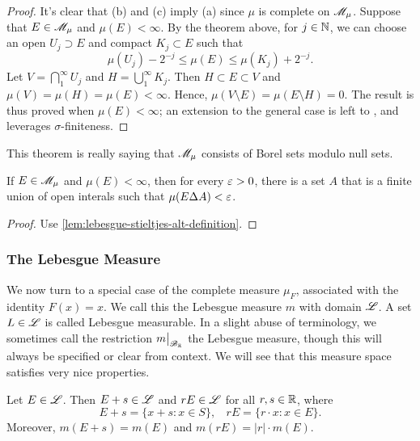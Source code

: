 \documentclass[12pt]{article} %
\begin{document}
\begin{proof}
    It's clear that (b) and (c) imply (a) since $\mu$ is complete on $\mathscr{M}_\mu$. Suppose that $E \in \mathscr{M}_\mu$ and $\mu(E) < \infty$. By the theorem above, for $j \in \mathbb{N}$, we can choose an open $U_j \supset E$ and compact $K_j \subset E$ such that \[\mu(U_j) - 2^{-j} \leq \mu(E) \leq \mu(K_j) + 2^{-j}.\]
    Let $V = \bigcap_1^\infty U_j$ and $H = \bigcup_1^\infty K_j$. Then $H \subset E \subset V$ and $\mu(V) = \mu(H) = \mu(E) < \infty$. Hence, $\mu(V \setminus E) = \mu(E \setminus H) = 0$. The result is thus proved when $\mu(E) < \infty$; an extension to the general case is left to \citet[Exercise~25]{folland1999real}, and leverages $\sigma$-finiteness.
\end{proof}

\begin{remark}
    This theorem is really saying that $\mathscr{M}_\mu$ consists of Borel sets modulo null sets.
\end{remark}

\begin{proposition}\label{prop:lebesgue-stieltjes-symmetric-difference}
    If $E \in \mathscr{M}_\mu$ and $\mu(E) < \infty$, then for every $\varepsilon > 0$, there is a set $A$ that is a finite union of open interals such that $\mu(E \Delta A) < \varepsilon$.
\end{proposition}

\begin{proof}
    Use \cref{lem:lebesgue-stieltjes-alt-definition}.
\end{proof}

\subsubsection{The Lebesgue Measure}

We now turn to a special case of the complete measure $\mu_F$, associated with the identity $F(x) = x$. We call this the Lebesgue measure $m$ with domain $\mathscr{L}$. A set $L \in \mathscr{L}$ is called Lebesgue measurable. In a slight abuse of terminology, we sometimes call the restriction $\restr{m}{\SB_\R}$ the Lebesgue measure, though this will always be specified or clear from context. We will see that this measure space satisfies very nice properties.

\begin{theorem}
    Let $E \in \mathscr{L}$. Then $E + s \in \mathscr{L}$ and $rE \in \mathscr{L}$ for all $r, s \in \mathbb{R}$, where \[E + s = \{x + s : x \in S\}, \ \ \ \ rE = \{r \cdot x : x \in E\}.\] Moreover, $m(E + s) = m(E)$ and $m(rE) = |r| \cdot m(E)$.
\end{theorem}
\end{document}
